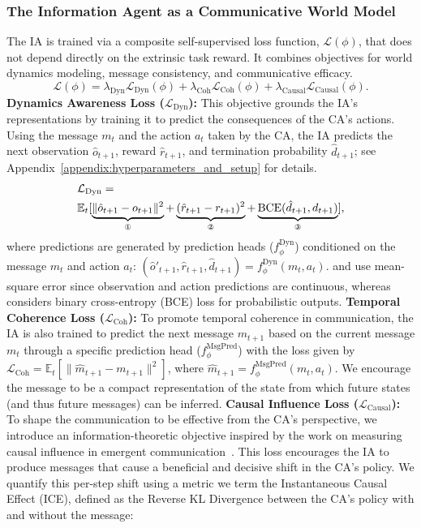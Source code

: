 \documentclass[letterpaper]{article}
\begin{document}
\subsubsection{The Information Agent as a Communicative World Model}
The IA is trained via a composite self-supervised loss function, $\mathcal{L}(\phi)$, that does not depend directly on the extrinsic task reward. It combines objectives for world dynamics modeling, message consistency, and communicative efficacy.
\begin{equation*}
    \mathcal{L}(\phi) = \lambda_{\text{Dyn}} \mathcal{L}_{\text{Dyn}}(\phi) + \lambda_{\text{Coh}} \mathcal{L}_{\text{Coh}}(\phi) + \lambda_{\text{Causal}} \mathcal{L}_{\text{Causal}}(\phi).
\end{equation*}
\textbf{Dynamics Awareness Loss ($\mathcal{L}_{\text{Dyn}}$):} This objective grounds the IA's representations by training it to predict the consequences of the CA's actions. Using the message $m_t$ and the action $a_t$ taken by the CA, the IA predicts the next observation $\hat{o}_{t+1}$, reward $\hat{r}_{t+1}$, and termination probability $\hat{d}_{t+1}$; see Appendix~\ref{appendix:hyperparameters_and_setup} for details.
\begin{align*}
    &\mathcal{L}_{\text{Dyn}}=\\
&\mathbb{E}_t [  \underbrace{\| \hat{o}_{t+1} - o_{t+1} \|^2}_{\text{\ding{172}}} + \underbrace{(\hat{r}_{t+1} - r_{t+1})^2}_{\text{\ding{173}}}   +  \underbrace{\text{BCE}(\hat{d}_{t+1}, d_{t+1})}_{\text{\ding{174}}}],
\end{align*}
where predictions are generated by prediction heads ($f_{\phi}^{\text{Dyn}}$) conditioned on the message $m_t$ and action $a_t$: $(\hat{o}'_{t+1}, \hat{r}_{t+1}, \hat{d}_{t+1}) = f_{\phi}^{\text{Dyn}}(m_t, a_t)$.  and  use mean-square error since observation and action predictions are continuous, whereas  considers binary cross-entropy (BCE) loss for probabilistic outputs.
\textbf{Temporal Coherence Loss ($\mathcal{L}_{\text{Coh}}$):} To promote temporal coherence in communication, the IA is also trained to predict the next message $m_{t+1}$ based on the current message $m_t$ through a specific prediction head ($f_{\phi}^{\text{MsgPred}}$) with the loss given by $\mathcal{L}_{\text{Coh}} = \mathbb{E}_t \left[ \| \hat{m}_{t+1} - m_{t+1} \|^2 \right]$, where $\hat{m}_{t+1} = f_{\phi}^{\text{MsgPred}}(m_t, a_t)$. We encourage the message to be a compact representation of the state from which future states (and thus future messages) can be inferred.
\textbf{Causal Influence Loss ($\mathcal{L}_{\text{Causal}}$):} To shape the communication to be effective from the CA's perspective, we introduce an information-theoretic objective inspired by the work on measuring causal influence in emergent communication~\cite{lowe2019pitfalls}. This loss encourages the IA to produce messages that cause a beneficial and decisive shift in the CA's policy. We quantify this per-step shift using a metric we term the Instantaneous Causal Effect (ICE), defined as the Reverse KL Divergence between the CA's policy with and without the message:
\end{document}
